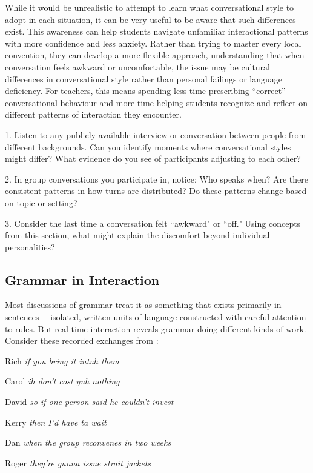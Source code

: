 While it would be unrealistic to attempt to learn what conversational style to adopt in each situation, it can be very useful to be aware that such differences exist. This awareness can help students navigate unfamiliar interactional patterns with more confidence and less anxiety. Rather than trying to master every local convention, they can develop a more flexible approach, understanding that when conversation feels awkward or uncomfortable, the issue may be cultural differences in conversational style rather than personal failings or language deficiency. For teachers, this means spending less time prescribing ``correct'' conversational behaviour and more time helping students recognize and reflect on different patterns of interaction they encounter.

\begin{tcolorbox}[title=Exercise: Cultural Patterns in Action, colback=white, colframe=red!75!black, fonttitle=\bfseries]
1. Listen to any publicly available interview or conversation between people from different backgrounds. Can you identify moments where conversational styles might differ? What evidence do you see of participants adjusting to each other?

2. In group conversations you participate in, notice: Who speaks when? Are there consistent patterns in how turns are distributed? Do these patterns change based on topic or setting?

3. Consider the last time a conversation felt ``awkward" or ``off." Using concepts from this section, what might explain the discomfort beyond individual personalities?
\end{tcolorbox}

\subsection{Grammar in Interaction} \label{subsec:grammar-interaction}

Most discussions of grammar treat it as something that exists primarily in sentences~-- isolated, written units of language constructed with careful attention to rules. But real-time interaction reveals grammar doing different kinds of work. Consider these recorded exchanges from \citet{lerner1991}:

\ea
  \ea
  \begin{dialogue}
      \item[Rich] \textit{if you bring it intuh them}
      \item[Carol] \textit{ih don't cost yuh nothing}
  \end{dialogue}
  \ex
  \begin{dialogue}
      \item[David] \textit{so if one person said he couldn't invest}
      \item[Kerry] \textit{then I'd have ta wait}
  \end{dialogue}
  \ex
  \begin{dialogue}
      \item[Dan] \textit{when the group reconvenes in two weeks}
      \item[Roger] \textit{they're gunna issue strait jackets}
  \end{dialogue}
  \z
\z

